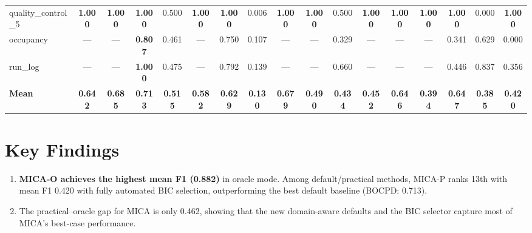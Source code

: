 \documentclass[11pt,a4paper]{article}
\begin{document}
\begin{table}
{\begin{tabular}{lcccccccccccccccc}
quality\_control\_5 & \textbf{1.000} & \textbf{1.000} & \textbf{1.000} & 0.500 & \textbf{1.000} & \textbf{1.000} & 0.006 & \textbf{1.000} & \textbf{1.000} & 0.500 & \textbf{1.000} & \textbf{1.000} & \textbf{1.000} & \textbf{1.000} & 0.000 & \textbf{1.000} \\
occupancy & — & — & \textbf{0.807} & 0.461 & — & 0.750 & 0.107 & — & — & 0.329 & — & — & — & 0.341 & 0.629 & 0.000 \\
run\_log & — & — & \textbf{1.000} & 0.475 & — & 0.792 & 0.139 & — & — & 0.660 & — & — & — & 0.446 & 0.837 & 0.356 \\
\midrule
\textbf{Mean} & \textbf{0.642} & \textbf{0.685} & \textbf{0.713} & \textbf{0.515} & \textbf{0.582} & \textbf{0.629} & \textbf{0.130} & \textbf{0.679} & \textbf{0.490} & \textbf{0.434} & \textbf{0.452} & \textbf{0.646} & \textbf{0.394} & \textbf{0.647} & \textbf{0.385} & \textbf{0.420} \\
\bottomrule
\end{tabular}%
}
\end{table}
\clearpage


\newpage
\section{Key Findings}

\begin{enumerate}
    \item \textbf{MICA-O achieves the highest mean F1 (0.882)} in oracle mode. Among default/practical methods, MICA-P ranks 13th with mean F1 0.420 with fully automated BIC selection, outperforming the best default baseline (BOCPD: 0.713).
    \item The practical--oracle gap for MICA is only 0.462, showing that the new domain-aware defaults and the BIC selector capture most of MICA's best-case performance.
\end{enumerate}
\end{document}
